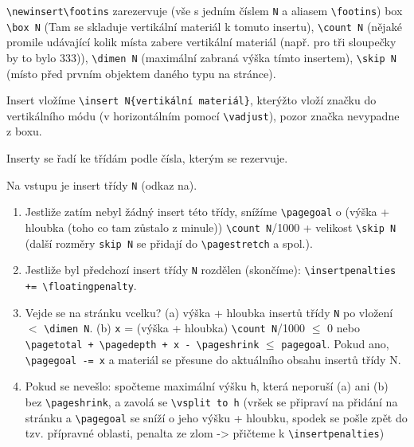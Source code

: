 \documentclass[12pt]{article}					%
\begin{document}
    \begin{definice}[Inzerty]
        \verb|\newinsert\footins| zarezervuje (vše s jedním číslem \verb|N| a aliasem \verb|\footins|) box \verb|\box N| (Tam se skladuje vertikální materiál k tomuto insertu), \verb|\count N| (nějaké promile udávající kolik místa zabere vertikální materiál (např. pro tři sloupečky by to bylo 333)), \verb|\dimen N| (maximální zabraná výška tímto insertem), \verb|\skip N| (místo před prvním objektem daného typu na stránce).

        Insert vložíme \verb|\insert N{vertikální materiál}|, kterýžto vloží značku do vertikálního módu (v horizontálním pomocí \verb|\vadjust|), pozor značka nevypadne z boxu.

        Inserty se řadí ke třídám podle čísla, kterým se rezervuje.
    \end{definice}

    \begin{definice}[Algoritmus]
            Na vstupu je insert třídy \verb|N| (odkaz na).


        \begin{enumerate}
            \item Jestliže zatím nebyl žádný insert této třídy, snížíme \verb|\pagegoal| o (výška + hloubka (toho co tam zůstalo z minule)) \verb|\count N|/1000 + velikost \verb|\skip N| (další rozměry \verb|skip N| se přidají do \verb|\pagestretch| a spol.).
            \item Jestliže byl předchozí insert třídy \verb|N| rozdělen (skončíme): \verb|\insertpenalties += \floatingpenalty|.
            \item Vejde se na stránku vcelku? (a) výška + hloubka insertů třídy \verb|N| po vložení $<$ \verb|\dimen N|. (b) \verb|x| = (výška + hloubka) \verb|\count N|/1000 $≤$ 0 nebo \verb|\pagetotal + \pagedepth + x - \pageshrink| $≤$ \verb|pagegoal|. Pokud ano, \verb|\pagegoal -= x| a materiál se přesune do aktuálního obsahu insertů třídy N.
            \item Pokud se nevešlo: spočteme maximální výšku \verb|h|, která neporuší (a) ani (b) bez \verb|\pageshrink|, a zavolá se \verb|\vsplit to h| (vršek se připraví na přidání na stránku a \verb|\pagegoal| se sníží o jeho výšku + hloubku, spodek se pošle zpět do tzv. přípravné oblasti, penalta ze zlom -> přičteme k \verb|\insertpenalties|)
        \end{enumerate}
    \end{definice}

\end{document}

